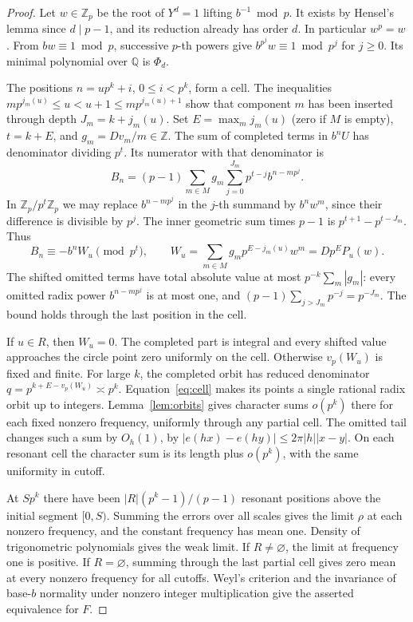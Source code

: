 \documentclass[11pt]{article}
\newcommand{\Z}{\mathbb Z}
\newcommand{\Q}{\mathbb Q}
\begin{document}
\begin{proof}
Let \(w\in\Z_p\) be the root of \(Y^d=1\) lifting \(b^{-1}\bmod p\). It exists by Hensel's lemma since \(d\mid p-1\), and its reduction already has order \(d\). In particular \(w^p=w\). From \(bw\equiv1\bmod p\), successive \(p\)-th powers give \(b^{p^j}w\equiv1\bmod p^j\) for \(j\ge0\). Its minimal polynomial over \(\Q\) is \(\Phi_d\).

The positions \(n=up^k+i\), \(0\le i<p^k\), form a cell. The inequalities \(mp^{j_m(u)}\le u<u+1\le mp^{j_m(u)+1}\) show that component \(m\) has been inserted through depth \(J_m=k+j_m(u)\). Set \(E=\max_m j_m(u)\) (zero if \(M\) is empty), \(t=k+E\), and \(g_m=Dv_m/m\in\Z\). The sum of completed terms in \(b^nU\) has denominator dividing \(p^t\). Its numerator with that denominator is
\[
 B_n=(p-1)\sum_{m\in M}g_m\sum_{j=0}^{J_m}p^{t-j}b^{n-mp^j}.
\]
In \(\Z_p/p^t\Z_p\) we may replace \(b^{n-mp^j}\) in the \(j\)-th summand by \(b^nw^m\), since their difference is divisible by \(p^j\). The inner geometric sum times \(p-1\) is \(p^{t+1}-p^{t-J_m}\). Thus
\begin{equation}\label{eq:cell}
 B_n\equiv -b^n W_u\pmod{p^t},\qquad
 W_u=\sum_{m\in M}g_mp^{E-j_m(u)}w^m=Dp^E P_u(w).
\end{equation}
The shifted omitted terms have total absolute value at most \(p^{-k}\sum_m|g_m|\): every omitted radix power \(b^{n-mp^j}\) is at most one, and \((p-1)\sum_{j>J_m}p^{-j}=p^{-J_m}\). The bound holds through the last position in the cell.

If \(u\in R\), then \(W_u=0\). The completed part is integral and every shifted value approaches the circle point zero uniformly on the cell. Otherwise \(v_p(W_u)\) is fixed and finite. For large \(k\), the completed orbit has reduced denominator \(q=p^{k+E-v_p(W_u)}\asymp p^k\). Equation~\eqref{eq:cell} makes its points a single rational radix orbit up to integers. Lemma~\ref{lem:orbits} gives character sums \(o(p^k)\) there for each fixed nonzero frequency, uniformly through any partial cell. The omitted tail changes such a sum by \(O_h(1)\), by \(|e(hx)-e(hy)|\le2\pi |h||x-y|\). On each resonant cell the character sum is its length plus \(o(p^k)\), with the same uniformity in cutoff.

At \(Sp^k\) there have been \(|R|(p^k-1)/(p-1)\) resonant positions above the initial segment \([0,S)\). Summing the errors over all scales gives the limit \(\rho\) at each nonzero frequency, and the constant frequency has mean one. Density of trigonometric polynomials gives the weak limit. If \(R\ne\varnothing\), the limit at frequency one is positive. If \(R=\varnothing\), summing through the last partial cell gives zero mean at every nonzero frequency for all cutoffs. Weyl's criterion and the invariance of base-\(b\) normality under nonzero integer multiplication \cite{weyl,wall} give the asserted equivalence for \(F\).
\end{proof}
\end{document}
